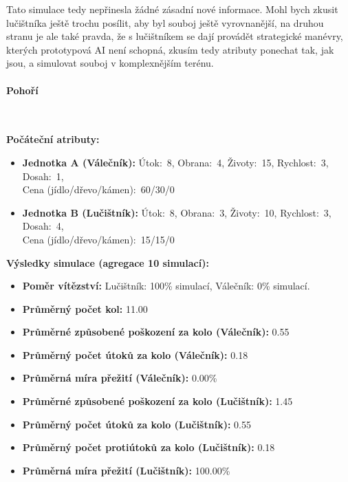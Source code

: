 Tato simulace tedy nepřinesla žádné zásadní nové informace. Mohl bych zkusit lučištníka ještě trochu posílit, aby byl souboj ještě vyrovnanější, na druhou stranu je ale také pravda, že s lučištníkem se dají provádět strategické manévry, kterých prototypová AI není schopná, zkusím tedy atributy ponechat tak, jak jsou, a simulovat souboj v komplexnějším terénu.

\paragraph{Pohoří}~ \newline

\textbf{Počáteční atributy:}
\begin{itemize}
\item \textbf{Jednotka A (Válečník):} Útok:~8, Obrana:~4, Životy:~15, Rychlost:~3, Dosah:~1, \\ Cena (jídlo/dřevo/kámen):~60/30/0
\item \textbf{Jednotka B (Lučištník):} Útok:~8, Obrana:~3, Životy:~10, Rychlost:~3, Dosah:~4, \\ Cena (jídlo/dřevo/kámen):~15/15/0
\end{itemize}

\textbf{Výsledky simulace (agregace 10 simulací):}
\begin{itemize}
\item \textbf{Poměr vítězství:} Lučištník: 100\% simulací, Válečník: 0\% simulací.
\item \textbf{Průměrný počet kol:} 11.00
\item \textbf{Průměrné způsobené poškození za kolo (Válečník):} 0.55
\item \textbf{Průměrný počet útoků za kolo (Válečník):} 0.18
\item \textbf{Průměrná míra přežití (Válečník):} 0.00\%
\item \textbf{Průměrné způsobené poškození za kolo (Lučištník):} 1.45
\item \textbf{Průměrný počet útoků za kolo (Lučištník):} 0.55
\item \textbf{Průměrný počet protiútoků za kolo (Lučištník):} 0.18
\item \textbf{Průměrná míra přežití (Lučištník):} 100.00\%
\end{itemize}


